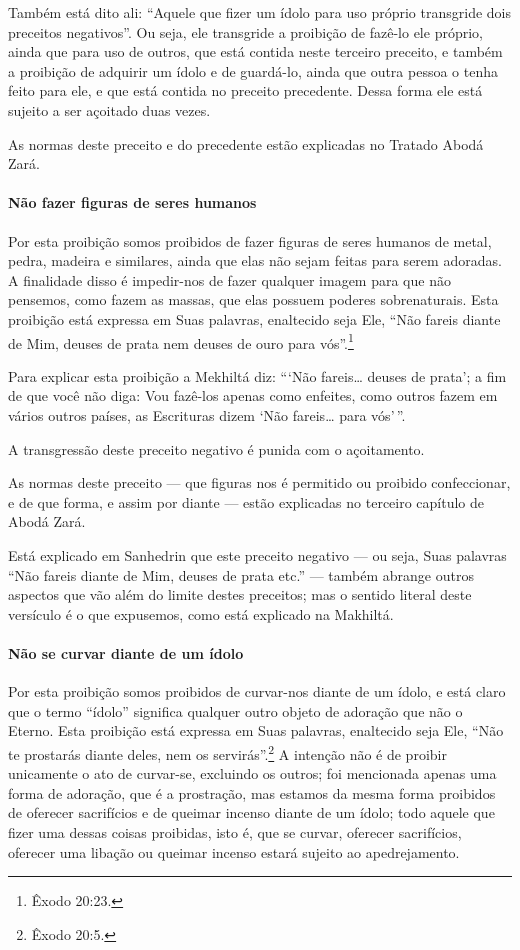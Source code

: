 Também está dito ali: ``Aquele que fizer um ídolo para uso próprio
transgride dois preceitos negativos''. Ou seja, ele transgride a
proibição de fazê-lo ele próprio, ainda que para uso de outros, que está
contida neste terceiro preceito, e também a proibição de adquirir um
ídolo e de guardá-lo, ainda que outra pessoa o tenha feito para ele, e
que está contida no preceito precedente. Dessa forma ele está sujeito a
ser açoitado duas vezes.

As normas deste preceito e do precedente estão explicadas no Tratado
Abodá Zará.

\paragraph{Não fazer figuras de seres humanos}

Por esta proibição somos proibidos de fazer figuras de seres humanos de
metal, pedra, madeira e similares, ainda que elas não sejam feitas para
serem adoradas. A finalidade disso é impedir-nos de fazer qualquer
imagem para que não pensemos, como fazem as massas, que elas possuem
poderes sobrenaturais. Esta proibição está expressa em Suas palavras,
enaltecido seja Ele, ``Não fareis diante de Mim, deuses de prata nem
deuses de ouro para vós''.\footnote{Êxodo 20:23.}

Para explicar esta proibição a Mekhiltá diz: ```Não fareis\ldots{} deuses de
prata'; a fim de que você não diga: Vou fazê-los apenas como enfeites,
como outros fazem em vários outros países, as Escrituras dizem `Não
fareis\ldots{} para vós'\,''.

A transgressão deste preceito negativo é punida com o açoitamento.

As normas deste preceito --- que figuras nos é permitido ou proibido
confeccionar, e de que forma, e assim por diante --- estão explicadas no
terceiro capítulo de Abodá Zará.

Está explicado em Sanhedrin que este preceito negativo --- ou seja, Suas
palavras ``Não fareis diante de Mim, deuses de prata etc.'' --- também
abrange outros aspectos que vão além do limite destes preceitos; mas o
sentido literal deste versículo é o que expusemos, como está explicado
na Makhiltá.

\paragraph{Não se curvar diante de um ídolo}

Por esta proibição somos proibidos de curvar-nos diante de um ídolo, e
está claro que o termo ``ídolo'' significa qualquer outro objeto de
adoração que não o Eterno. Esta proibição está expressa em Suas
palavras, enaltecido seja Ele, ``Não te prostarás diante deles, nem os
servirás''.\footnote{Êxodo 20:5.} A intenção não é de proibir unicamente o ato de
curvar-se, excluindo os outros; foi mencionada apenas uma forma de
adoração, que é a prostração, mas estamos da mesma forma proibidos de
oferecer sacrifícios e de queimar incenso diante de um ídolo; todo
aquele que fizer uma dessas coisas proibidas, isto é, que se curvar,
oferecer sacrifícios, oferecer uma libação ou queimar incenso estará
sujeito ao apedrejamento.


